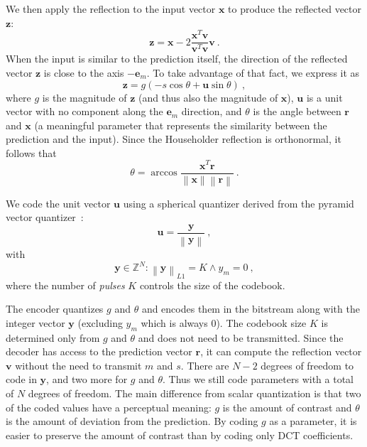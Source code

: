 \documentclass[english,conference,10pt]{IEEEtran}
\begin{document}
We then apply the reflection to the input vector
$\mathbf{x}$ to produce the reflected vector $\mathbf{z}$:
\begin{equation}
\mathbf{z} = \mathbf{x} - 2\frac{\mathbf{x}^T\mathbf{v}}
{\mathbf{v}^T\mathbf{v}}\mathbf{v}\ .
\end{equation}
When the input is similar to the prediction itself, the direction of the
reflected vector $\mathbf{z}$ is close to the axis $-\mathbf{e}_m$. To take
advantage of that fact, we express it as
\begin{equation}
\mathbf{z} = g\left(-s\cos\theta + \mathbf{u}\sin\theta\right)\ ,
\end{equation}
where $g$ is the magnitude of $\mathbf{z}$ (and thus also the magnitude of
$\mathbf{x}$), $\mathbf{u}$ is a unit vector with no component along the
$\mathbf{e}_m$ direction, and $\theta$ is the angle between $\mathbf{r}$ and
$\mathbf{x}$ (a meaningful parameter that represents the similarity between
the prediction and the input). Since the Householder reflection is orthonormal,
it follows that
\begin{equation}
\theta = \arccos\frac{\mathbf{x}^T\mathbf{r}}
                   {\left\|\mathbf{x}\right\|\left\|\mathbf{r}\right\|}\ .
\end{equation}

We code the unit vector $\mathbf{u}$ using a spherical quantizer derived
from the pyramid vector quantizer~\cite{Fischer1986}:
\begin{equation}
\mathbf{u}=\frac{\mathbf{y}}{\left\|\mathbf{y}\right\|}\ ,
\end{equation}
with
\begin{equation}
\mathbf{y} \in \mathbb{Z}^N : \left\|\mathbf{y}\right\|_{L1} = K \land y_m=0\ ,
\end{equation}
where the number of \textit{pulses} $K$ controls the size of the codebook.

The encoder quantizes $g$ and $\theta$ and encodes them in the bitstream along
with the integer vector $\mathbf{y}$ (excluding $y_m$ which is always $0$). The codebook
size $K$ is determined only from $g$ and $\theta$ and does not need to be
transmitted. Since the decoder has access to the prediction vector $\mathbf{r}$,
it can compute the reflection vector $\mathbf{v}$ without the need to transmit
$m$ and $s$. There are $N-2$ degrees of freedom to code in
$\mathbf{y}$, and two more for $g$ and $\theta$. Thus we still code parameters
with a total of $N$ degrees of freedom. The main difference from scalar
quantization is that two of the
coded values have a perceptual meaning: $g$ is the amount of contrast and
$\theta$ is the amount of deviation from the prediction. By coding $g$
as a parameter, it is easier to preserve the amount of contrast than by
coding only DCT coefficients.
\end{document}
